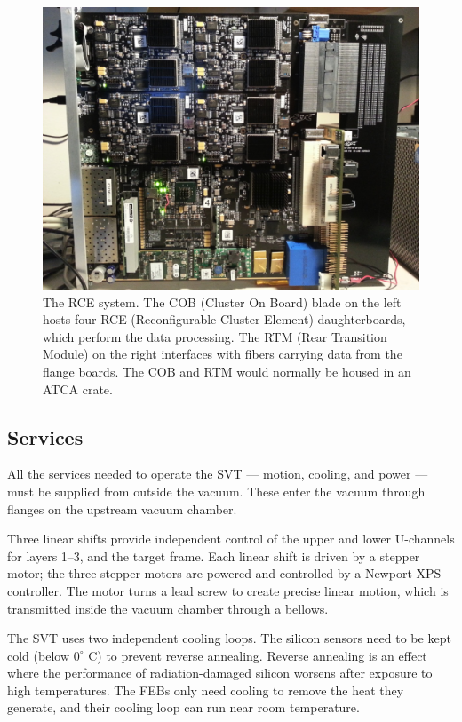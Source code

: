 \begin{figure}[htp]
    \includegraphics[width=\textwidth]{detector/figs/rce}
    \caption{The RCE system. The COB (Cluster On Board) blade on the left hosts four RCE (Reconfigurable Cluster Element) daughterboards, which perform the data processing. The RTM (Rear Transition Module) on the right interfaces with fibers carrying data from the flange boards. The COB and RTM would normally be housed in an ATCA crate.}
    \label{fig:rce}
\end{figure}

\subsection{Services}
\label{sec:svt_services}
All the services needed to operate the SVT --- motion, cooling, and power --- must be supplied from outside the vacuum.
These enter the vacuum through flanges on the upstream vacuum chamber.

Three linear shifts provide independent control of the upper and lower U-channels for layers 1--3, and the target frame.
Each linear shift is driven by a stepper motor; the three stepper motors are powered and controlled by a Newport XPS controller.
The motor turns a lead screw to create precise linear motion, which is transmitted inside the vacuum chamber through a bellows.

The SVT uses two independent cooling loops.
The silicon sensors need to be kept cold (below $0^\circ$ C) to prevent reverse annealing.
Reverse annealing is an effect where the performance of radiation-damaged silicon worsens after exposure to high temperatures.
The FEBs only need cooling to remove the heat they generate, and their cooling loop can run near room temperature.

